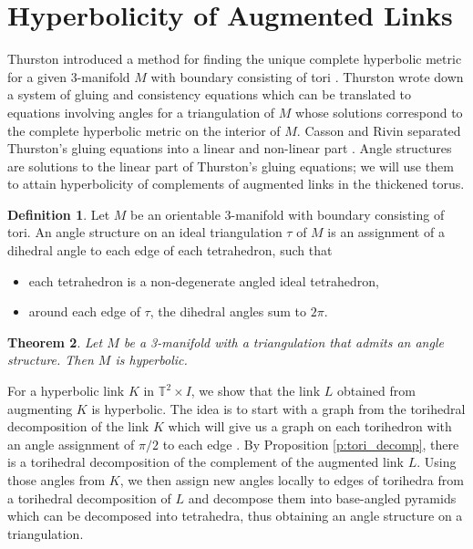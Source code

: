 \documentclass[11pt]{amsart}
\newcommand{\prpref}[1]{Proposition \ref{#1}}
\newcommand{\torus}{{\mathbb{T}^2}}
\theoremstyle{plain}
\newtheorem{theorem}{Theorem}[section]
\theoremstyle{definition}
\newtheorem{define}[theorem]{Definition}
\begin{document}
\section{Hyperbolicity of Augmented Links}
\label{s:hyperbolicity}
Thurston introduced a method for finding the
unique complete hyperbolic metric for a given 3-manifold $M$
with boundary consisting of tori \cite{Thurston}. 
Thurston wrote down a system of gluing and consistency equations
which can be translated to equations involving
angles for a triangulation of $M$ whose solutions correspond to the
complete hyperbolic metric on the interior of $M$.
Casson and Rivin separated Thurston's
gluing equations into a linear and non-linear part \cite{Casson-Rivin}.
Angle structures are solutions to the linear part of
Thurston's gluing equations;
we will use them to attain hyperbolicity of complements
of augmented links in the thickened torus.


\begin{define}
Let $M$ be an orientable 3-manifold with boundary consisting of tori. An angle
structure on an ideal triangulation $\tau$ of $M$ is an assignment of a dihedral
angle to each edge of each tetrahedron, such that
\begin{itemize}
\item each tetrahedron is a non-degenerate angled ideal tetrahedron,
\item around each edge of $\tau$, the dihedral angles sum to $2\pi$.
\end{itemize}
\end{define}



\begin{theorem}\cite[Theorem 1.1]{FG-angles}
Let $M$ be a 3-manifold with a triangulation that admits an angle structure.
Then $M$ is hyperbolic.
\end{theorem}


For a hyperbolic link $K$ in $\torus \times I$, we show
that the link $L$ obtained from augmenting $K$ is hyperbolic.
The idea is to start with a graph from the torihedral decomposition
of the link $K$ which will give us a graph on each torihedron with an angle
assignment of $\pi/2$ to each edge \cite{CKP2}.
By \prpref{p:tori_decomp},
there is a torihedral decomposition of the complement of the augmented link $L$.
Using those angles from $K$,
we then assign new angles locally to edges of torihedra from a torihedral 
decomposition of $L$
and decompose them into base-angled pyramids which can be decomposed 
into tetrahedra, thus obtaining an angle structure on a triangulation.
\end{document}
